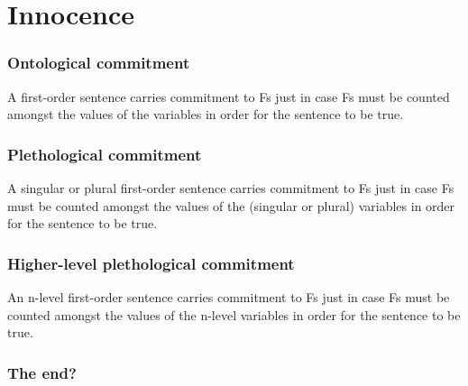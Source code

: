 \documentclass[serif]{beamer}
\begin{document}
\section{Innocence}

\begin{frame}
\frametitle{Ontological commitment}

A first-order sentence carries commitment to Fs just in case Fs must be counted amongst the values of the variables in order for the sentence to be true.

\end{frame}

\begin{frame}
\frametitle{Plethological commitment}

A singular or plural first-order sentence carries commitment to Fs just in case Fs must be counted amongst the values of the (singular or plural) variables in order for the sentence to be true.
\end{frame}

\begin{frame}
\frametitle{Higher-level plethological commitment}

An n-level first-order sentence carries commitment to Fs just in case Fs must be counted amongst the values of the n-level variables in order for the sentence to be true.

\end{frame}

\begin{frame}
\frametitle{The end?}


\end{frame}



\end{document}
